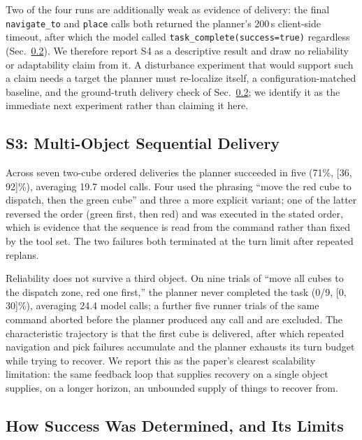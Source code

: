 Two of the four runs are additionally weak as evidence of delivery: the
final \texttt{navigate\_to} and \texttt{place} calls both returned the
planner's 200\,s client-side timeout, after which the model called
\texttt{task\_complete(success=true)} regardless (Sec.~\ref{sec:verif}).
We therefore report S4 as a descriptive result and draw no reliability or
adaptability claim from it. A disturbance experiment that would support such
a claim needs a target the planner must re-localize itself, a
configuration-matched baseline, and the ground-truth delivery check of
Sec.~\ref{sec:verif}; we identify it as the immediate next experiment rather
than claiming it here.



\subsection{S3: Multi-Object Sequential Delivery}
\label{sec:s3}

Across seven two-cube ordered deliveries the planner succeeded in five
(71\%, [36, 92]\%), averaging 19.7 model calls. Four used the phrasing
``move the red cube to dispatch, then the green cube'' and three a more
explicit variant; one of the latter reversed the order (green first, then
red) and was executed in the stated order, which is evidence that the
sequence is read from the command rather than fixed by the tool set. The two
failures both terminated at the turn limit after repeated replans.

Reliability does not survive a third object. On nine trials of ``move all
cubes to the dispatch zone, red one first,'' the planner never completed the
task (0/9, [0, 30]\%), averaging 24.4 model calls; a further five runner
trials of the same command aborted before the planner produced any call and
are excluded. The characteristic trajectory is that the first cube is
delivered, after which repeated navigation and pick failures accumulate and
the planner exhausts its turn budget while trying to recover. We report this
as the paper's clearest scalability limitation: the same feedback loop that
supplies recovery on a single object supplies, on a longer horizon, an
unbounded supply of things to recover from.



\subsection{How Success Was Determined, and Its Limits}
\label{sec:verif}

